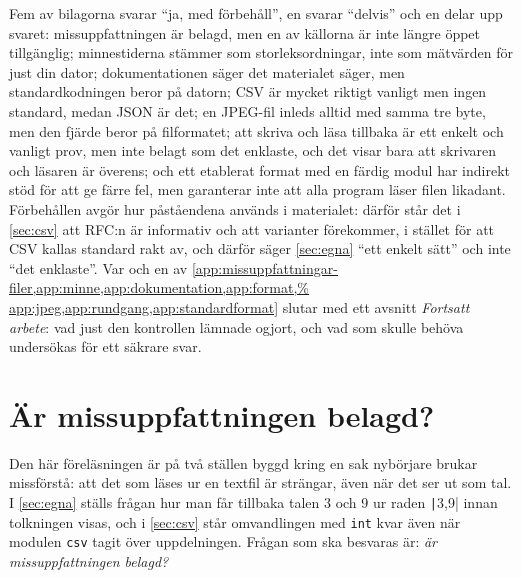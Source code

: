 Fem av bilagorna svarar \enquote{ja, med förbehåll}, en svarar
\enquote{delvis} och en delar upp svaret: missuppfattningen är belagd,
men en av källorna är inte längre öppet tillgänglig; minnestiderna
stämmer som storleksordningar, inte som mätvärden för just din dator;
dokumentationen säger det materialet säger, men standardkodningen beror
på datorn; CSV är mycket riktigt vanligt men ingen standard, medan JSON
är det; en JPEG-fil inleds alltid med samma tre byte, men den fjärde
beror på filformatet; att skriva och läsa tillbaka är ett enkelt och
vanligt prov, men inte belagt som det enklaste, och det visar bara att
skrivaren och läsaren är överens; och ett etablerat format med en färdig
modul har indirekt stöd för att ge färre fel, men garanterar inte att
alla program läser filen likadant.  Förbehållen avgör hur påståendena
används i materialet: därför står det i \cref{sec:csv} att RFC:n är
informativ och att varianter förekommer, i stället för att CSV kallas
standard rakt av, och därför säger \cref{sec:egna} \enquote{ett enkelt
sätt} och inte \enquote{det enklaste}.  Var och en av
\cref{app:missuppfattningar-filer,app:minne,app:dokumentation,app:format,%
app:jpeg,app:rundgang,app:standardformat} slutar med ett avsnitt
\emph{Fortsatt arbete}: vad just den kontrollen lämnade ogjort, och vad
som skulle behöva undersökas för ett säkrare svar.


\chapter{Är missuppfattningen belagd?}
\label{app:missuppfattningar-filer}

Den här föreläsningen är på två ställen byggd kring en sak nybörjare
brukar missförstå: att det som läses ur en textfil är strängar, även när
det ser ut som tal.  I \cref{sec:egna} ställs frågan hur man får tillbaka
talen 3 och 9 ur raden \texttt|3,9| innan tolkningen visas,
och i \cref{sec:csv} står omvandlingen med \texttt{int} kvar
även när modulen \texttt{csv} tagit över uppdelningen.%
Frågan som ska besvaras är: \emph{är missuppfattningen
belagd?}

